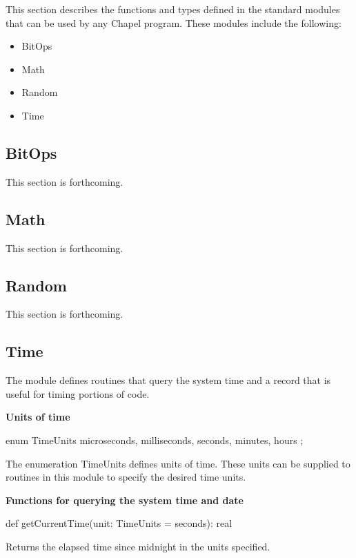 \label{Standard_Modules}

This section describes the functions and types defined in the standard
modules that can be used by any Chapel program.  These modules include
the following:
\begin{itemize}
\item BitOps
\item Math
\item Random
\item Time
\end{itemize}

\subsection{BitOps}
\label{BitOps}

This section is forthcoming.

\subsection{Math}
\label{Math}

This section is forthcoming.

\subsection{Random}
\label{Random}

This section is forthcoming.

\subsection{Time}
\label{Time}

The module  defines routines that query the system time and
a record  that is useful for timing portions of code.

{\bf Units of time}

\begin{chapel}
enum TimeUnits { microseconds, milliseconds, seconds, minutes, hours };
\end{chapel}
The enumeration TimeUnits defines units of time.  These units can be
supplied to routines in this module to specify the desired time units.

{\bf Functions for querying the system time and date}

\begin{chapel}
def getCurrentTime(unit: TimeUnits = seconds): real
\end{chapel}
Returns the elapsed time since midnight in the units specified.

